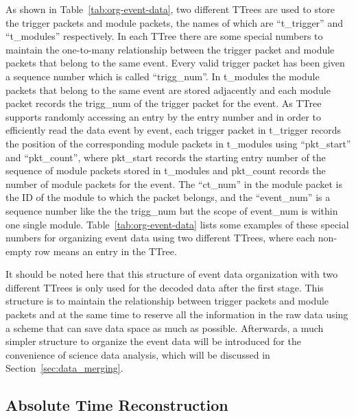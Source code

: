 \documentclass{raa}
\begin{document}
As shown in Table~\ref{tab:org-event-data}, two different TTrees are used to store the trigger packets and module packets, the names of which are ``t\_trigger'' and ``t\_modules'' respectively. In each TTree there are some special numbers to maintain the one-to-many relationship between the trigger packet and module packets that belong to the same event. Every valid trigger packet has been given a sequence number which is called ``trigg\_num''. In t\_modules the module packets that belong to the same event are stored adjacently and each module packet records the trigg\_num of the trigger packet for the event. As TTree supports randomly accessing an entry by the entry number and in order to efficiently read the data event by event, each trigger packet in t\_trigger records the position of the corresponding module packets in t\_modules using ``pkt\_start'' and ``pkt\_count'', where pkt\_start records the starting entry number of the sequence of module packets stored in t\_modules and pkt\_count records the number of module packets for the event. The ``ct\_num'' in the module packet is the ID of the module to which the packet belongs, and the ``event\_num'' is a sequence number like the the trigg\_num but the scope of event\_num is within one single module. Table~\ref{tab:org-event-data} lists some examples of these special numbers for organizing event data using two different TTrees, where each non-empty row means an entry in the TTree.

It should be noted here that this structure of event data organization with two different TTrees is only used for the decoded data after the first stage. This structure is to maintain the relationship between trigger packets and module packets and at the same time to reserve all the information in the raw data using a scheme that can save data space as much as possible. Afterwards, a much simpler structure to organize the event data will be introduced for the convenience of science data analysis, which will be discussed in Section~\ref{sec:data_merging}.

\subsection{Absolute Time Reconstruction}\label{sec:abs_time_recon}
\end{document}
